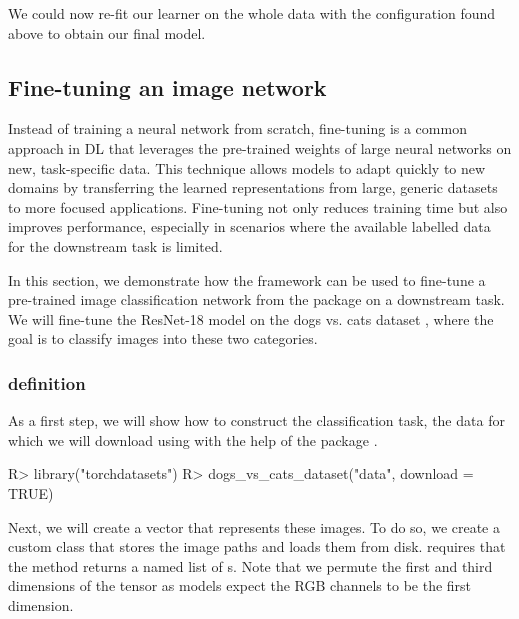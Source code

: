\documentclass[article]{jss}
\theoremstyle{definition}
\begin{document}
We could now re-fit our learner on the whole data with the configuration found above to obtain our final model.

\subsection{Fine-tuning an image network}\label{sec:finetuning}

Instead of training a neural network from scratch, fine-tuning is a common approach in DL that leverages the pre-trained weights of large neural networks on new, task-specific data.
This technique allows models to adapt quickly to new domains by transferring the learned representations from large, generic datasets to more focused applications.
Fine-tuning not only reduces training time but also improves performance, especially in scenarios where the available labelled data for the downstream task is limited.

In this section, we demonstrate how the  framework can be used to fine-tune a pre-trained image classification network from the  package on a downstream task.
We will fine-tune the ResNet-18 model \citep{ref-he2015deepresiduallearningimage} on the dogs vs. cats dataset \citep{ref-dogs-vs-cats2013}, where the goal is to classify images into these two categories.

\subsubsection[Task definition]{ definition}

As a first step, we will show how to construct the classification task, the data for which we will download using with the help of the  \rlang{} package \citep{torchdatasets}.

\begin{CodeInput}
R> library("torchdatasets")
R> dogs_vs_cats_dataset("data", download = TRUE)
\end{CodeInput}

Next, we will create a  vector that represents these images.
To do so, we create a custom  class that stores the image paths and loads them from disk.
 requires that the  method returns a named list of s.
Note that we permute the first and third dimensions of the tensor as  models expect the RGB channels to be the first dimension.
\end{document}
